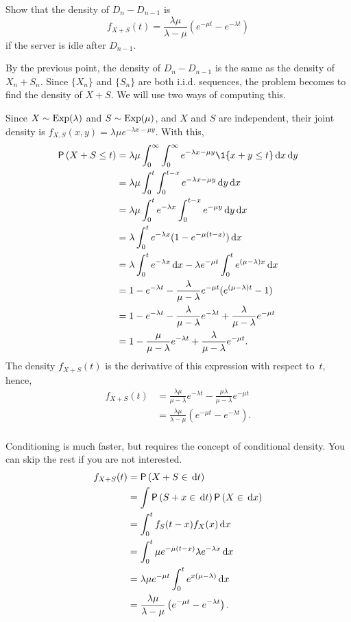 \documentclass[companion]{subfiles}
\begin{document}
\begin{extra}
Show that the density of $D_{n} - D_{n-1}$ is
 \begin{equation*}
 f_{X+S}(t) = \frac{\lambda \mu}{\lambda - \mu} (e^{-\mu t} - e^{-\lambda t})
 \end{equation*}
if the server is idle after $D_{n-1}$.
\begin{solution}
 By the previous point, the density of $D_{n} - D_{n-1}$ is the
 same as the density of $X_n + S_n$. Since $\{X_n\}$ and $\{S_n\}$ are both i.i.d. sequences, the problem becomes to find the density of $X+S$. We will use two ways of computing this. 

Since $X\sim \operatorname{Exp}(\lambda)$ and $S\sim\operatorname{Exp}(\mu)$, and $X$ and $S$ are independent, their joint density is $f_{X,S}(x,y) = \lambda \mu e^{-\lambda x - \mu y}$. With this,
 \begin{align*}
\P{X+S\leq t } 
&= \lambda \mu \int_0^\infty \int_0^\infty e^{-\lambda x - \mu y} \1{x+y\leq t} \d x \d y \\
&= \lambda \mu \int_0^t \int_0^{t-x} e^{-\lambda x - \mu y} \d y \d x \\
&= \lambda \mu \int_0^t e^{-\lambda x} \int_0^{t-x} e^{- \mu y} \d y \d x \\
&= \lambda \int_0^t e^{-\lambda x} (1-e^{- \mu (t-x)} ) \d x \\
&= \lambda \int_0^t e^{-\lambda x} \d x - \lambda e^{-\mu t} \int_0^t e^{(\mu-\lambda) x} \d x \\
&= 1- e^{-\lambda t} - \frac{\lambda}{\mu-\lambda} e^{-\mu t} ( e^{(\mu-\lambda) t} -1) \\
&= 1- e^{-\lambda t} - \frac{\lambda}{\mu-\lambda} e^{-\lambda t} + \frac{\lambda}{\mu-\lambda} e^{-\mu t} \\ 
&= 1 - \frac{\mu}{\mu-\lambda} e^{-\lambda t} + \frac{\lambda}{\mu-\lambda} e^{-\mu t}. \\
 \end{align*}
The density $f_{X+S}(t)$ is the derivative of this expression with respect to~$t$, hence,
\begin{align*}
 f_{X+S}(t) 
&= \frac{\lambda\mu}{\mu-\lambda} e^{-\lambda t} - \frac{\mu \lambda}{\mu-\lambda} e^{-\mu t} \\
&= \frac{\lambda\mu}{\lambda -\mu}(e^{-\mu t} - e^{-\lambda t}). \\
\end{align*}

Conditioning is much faster, but requires the concept of conditional density. You can skip the rest if you are not interested. 
 \begin{align*}
 f_{X+S}(t) 
&= \P{X+S\in \d{t}} \\
&= \int \P{S+x\in \d{t}}\P{X\in \d{x}} \\
&=\int_0^t f_S(t-x) f_X(x) \d{x} \\
 &= \int_0^t \mu e^{-\mu(t-x)} \lambda e^{-\lambda x} \d{x} \\
 &= \lambda \mu e^{-\mu t} \int_0^t e^{x(\mu-\lambda)} \d{x} \\
&= \frac{\lambda \mu}{\lambda - \mu}\left(e^{-\mu t} - e^{-\lambda t}\right).
 \end{align*}
\end{solution}
\end{extra}
\end{document}
